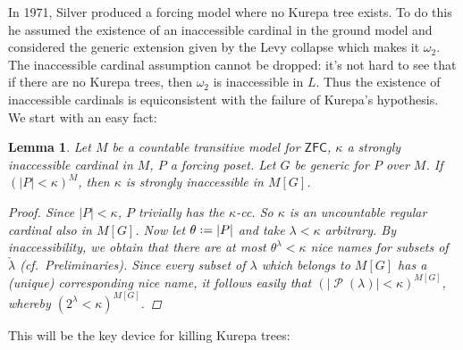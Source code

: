 \documentclass[11pt,a4paper]{report}
\newtheorem{lemma}[theorem]{Lemma}
\theoremstyle{definition}
\theoremstyle{num.custom-title}
\theoremstyle{custom-title}
\DeclareMathOperator{\PP}{\mathcal{P}}
\newcommand{\ZFC}{\ensuremath{\mathsf{ZFC}}\xspace}
\newcommand*{\defeq}{\mathrel{\rlap{%
                     \raisebox{0.3ex}{$\cdot$}}%
                     \raisebox{-0.3ex}{$\cdot$}}%
                     =}
\begin{document}
In 1971, Silver produced a forcing model where no Kurepa tree exists. To do this he assumed the existence 	of an inaccessible cardinal in the ground model and considered the generic extension given by the Levy collapse which makes it $\omega_2$. The inaccessible cardinal assumption cannot be dropped: it's not hard to see that if there are no Kurepa trees, then $\omega_2$ is inaccessible in $L$. Thus the existence of inaccessible cardinals is equiconsistent with the failure of Kurepa's hypothesis.\\

We start with an easy fact:
\begin{lemma}\label{lemma-preserving_inaccessible_cardinals}
Let $M$ be a countable transitive model for \ZFC, $\kappa$ a strongly inaccessible cardinal in $M$, $P$ a forcing poset. Let $G$ be generic for $P$ over $M$. If $(|P| < \kappa)^M$, then $\kappa$ is strongly inaccessible in $M[G]$.
\begin{proof}
Since $|P| < \kappa$, $P$ trivially has the $\kappa$-cc. So $\kappa$ is an uncountable regular cardinal also in $M[G]$. Now let $\theta \defeq |P|$ and take $\lambda < \kappa$ arbitrary. By inaccessibility, we obtain that there are at most $\theta^\lambda < \kappa$ nice names for subsets of $\check{\lambda}$ (cf.\ Preliminaries). Since every subset of $\lambda$ which belongs to $M[G]$ has a (unique) corresponding nice name, it follows easily that $(|{\PP(\lambda)}| < \kappa)^{M[G]}$, whereby $(2^\lambda < \kappa)^{M[G]}$.
\end{proof}
\end{lemma}

This will be the key device for killing Kurepa trees:
\end{document}
